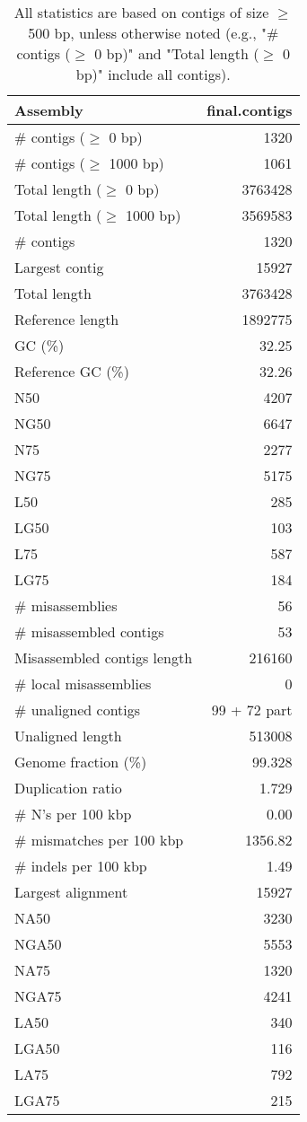 \documentclass[12pt,a4paper]{article}
\begin{document}
\begin{table}[ht]
\begin{center}
\caption{All statistics are based on contigs of size $\geq$ 500 bp, unless otherwise noted (e.g., "\# contigs ($\geq$ 0 bp)" and "Total length ($\geq$ 0 bp)" include all contigs).}
\begin{tabular}{|l*{1}{|r}|}
\hline
Assembly & final.contigs \\ \hline
\# contigs ($\geq$ 0 bp) & 1320 \\ \hline
\# contigs ($\geq$ 1000 bp) & 1061 \\ \hline
Total length ($\geq$ 0 bp) & 3763428 \\ \hline
Total length ($\geq$ 1000 bp) & 3569583 \\ \hline
\# contigs & 1320 \\ \hline
Largest contig & 15927 \\ \hline
Total length & 3763428 \\ \hline
Reference length & 1892775 \\ \hline
GC (\%) & 32.25 \\ \hline
Reference GC (\%) & 32.26 \\ \hline
N50 & 4207 \\ \hline
NG50 & 6647 \\ \hline
N75 & 2277 \\ \hline
NG75 & 5175 \\ \hline
L50 & 285 \\ \hline
LG50 & 103 \\ \hline
L75 & 587 \\ \hline
LG75 & 184 \\ \hline
\# misassemblies & 56 \\ \hline
\# misassembled contigs & 53 \\ \hline
Misassembled contigs length & 216160 \\ \hline
\# local misassemblies & 0 \\ \hline
\# unaligned contigs & 99 + 72 part \\ \hline
Unaligned length & 513008 \\ \hline
Genome fraction (\%) & 99.328 \\ \hline
Duplication ratio & 1.729 \\ \hline
\# N's per 100 kbp & 0.00 \\ \hline
\# mismatches per 100 kbp & 1356.82 \\ \hline
\# indels per 100 kbp & 1.49 \\ \hline
Largest alignment & 15927 \\ \hline
NA50 & 3230 \\ \hline
NGA50 & 5553 \\ \hline
NA75 & 1320 \\ \hline
NGA75 & 4241 \\ \hline
LA50 & 340 \\ \hline
LGA50 & 116 \\ \hline
LA75 & 792 \\ \hline
LGA75 & 215 \\ \hline
\end{tabular}
\end{center}
\end{table}
\end{document}
